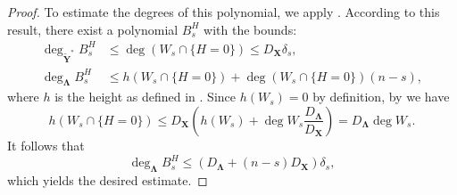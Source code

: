 \documentclass[pdflatex,sn-basic]{sn-jnl}%
\theoremstyle{thmstyleone}%
\theoremstyle{thmstyletwo}%
\theoremstyle{thmstylethree}%
\theoremstyle{definition}
\numberwithin{equation}{section}
\newcommand{\bfs}{\boldsymbol}
\begin{document}
\begin{proof}
To estimate
the degrees of this polynomial, we apply \cite[Theorem
3.1]{DaKrSo13}. According to this result, there
exist a polynomial $B_s^H$ with the bounds:
%
\begin{align*}
\deg_{\widetilde{\bfs Y}^*}B_s^H&\le \deg (W_s\cap \{H=0\})\le D_{\bfs X}\delta_s,\\
\deg_{\bfs \Lambda}B_s^H&\le h(W_s\cap \{H=0\})+
\deg (W_s\cap \{H=0\})(n-s),\end{align*}
%
where $h$ is the height as defined in \cite[Definition
2.2]{DaKrSo13}. Since $h(W_s)=0$ by definition,
by \cite[Corollary 2.20]{DaKrSo13} we have
%
$$h(W_s\cap \{H=0\})\le D_{\bfs X}\left(h(W_s) +\deg W_s\frac{D_{\bfs \Lambda}}{D_{\bfs X}}\right)=
D_{\bfs \Lambda}\deg W_s.$$
%
It follows that
%
$$\deg_{\bfs \Lambda}B_s^H\le (D_{\bfs \Lambda}+(n-s)D_{\bfs
X})\delta_s,$$
%
which yields the desired estimate.
\end{proof}
\end{document}
